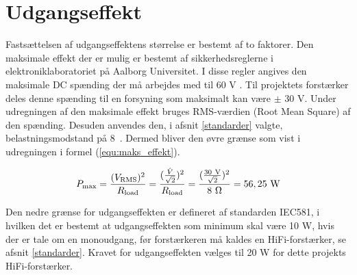 \section{Udgangseffekt}
\label{valg_udgangseffekt}
Fastsættelsen af udgangseffektens størrelse er bestemt af to faktorer. Den maksimale effekt der er mulig er bestemt af sikkerhedsreglerne i elektroniklaboratoriet på Aalborg Universitet. I disse regler angives den maksimale DC spænding der må arbejdes med til 60 V \cite{elregler-b1101}. 
Til projektets forstærker deles denne spænding til en forsyning som maksimalt kan være $\pm$ 30 V. Under udregningen af den maksimale effekt bruges RMS-værdien (Root Mean Square) af den spænding. Desuden anvendes den, i afsnit \ref{standarder} valgte, belastningsmodstand på 8~\ohm. Dermed bliver den øvre grænse som vist i udregningen i formel (\ref{equ:maks_effekt}).

\begin{equation}
\label{equ:maks_effekt}
P_{\mathrm{max}} = \frac{(V_{\mathrm{RMS}})^2}{R_{\mathrm{load}}}= \frac{(\frac{\hat{V}}{\sqrt{2}})^2}{R_{\mathrm{load}}} = \frac{(\frac{\mathrm{30~V}}{\sqrt{2}})^2}{8~\ohm} = \mathrm{56,25~W}
\end{equation}

Den nedre grænse for udgangseffekten er defineret af standarden IEC581, i hvilken det er bestemt at udgangseffekten som minimum skal være 10 W, hvis der er tale om en monoudgang, før forstærkeren må kaldes en HiFi-forstærker, se afsnit \ref{standarder}. Kravet for udgangseffekten vælges til 20 W for dette projekts HiFi-forstærker.
